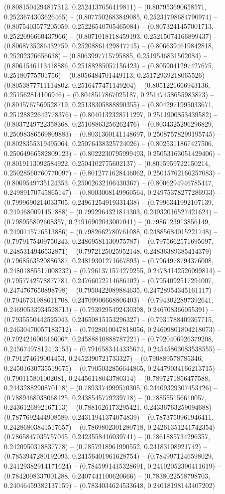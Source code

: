(0.8081504294817312, 0.2524137656419811) -- (0.807953690658571, 0.2523674303626465) -- (0.8077502683849085, 0.25231798684790974) -- (0.8075403577205059, 0.25226540705465084) -- (0.8073241457001713, 0.2522096660437966) -- (0.8071018118459193, 0.25215074166899437) -- (0.8068735286432759, 0.25208861429847745) -- (0.8066394619842818, 0.25202326656638) -- (0.8063997715795885, 0.2519546831502084) -- (0.8061546113418886, 0.25188285057156423) -- (0.8059041297427675, 0.25180775701756) -- (0.8056484701449113, 0.25172939218065526) -- (0.8053877711114802, 0.2516477471149204) -- (0.8051221666943136, 0.251562814106946) -- (0.8048517867025187, 0.25147458655983873) -- (0.8045767569528719, 0.25138305888890355) -- (0.8042971995033671, 0.25128822642778376) -- (0.8040132328711297, 0.2511900853439582) -- (0.8037249722358368, 0.25108863256262476) -- (0.8034325296296829, 0.25098386569809883) -- (0.8031360141148697, 0.25087578299195745) -- (0.8028355319495064, 0.25076438325724026) -- (0.8025311867427506, 0.25064966582809123) -- (0.8022230795999493, 0.25053163051429406) -- (0.8019113092584922, 0.2504102775602137) -- (0.8015959722150214, 0.25028560760770097) -- (0.8012771628446062, 0.25015762166257083) -- (0.8009549735124353, 0.25002632106430367) -- (0.8006294946785447, 0.24989170745865147) -- (0.8003008149960564, 0.24975378277286933) -- (0.7999690214033705, 0.24961254919331438) -- (0.7996341992107139, 0.2494680091451888) -- (0.7992964321814303, 0.24932016527421624) -- (0.798955802608357, 0.24916902043007041) -- (0.7986123913856149, 0.2490145776513886) -- (0.7982662780761088, 0.24885684015221748) -- (0.7979175409750243, 0.24869581130975787) -- (0.7975662571695697, 0.2485314946532871) -- (0.7972125025952148, 0.24836389385414379) -- (0.7968563520886387, 0.24819301271667893) -- (0.7964978794376008, 0.24801885517008232) -- (0.7961371574279255, 0.24784142526099814) -- (0.7957742578877781, 0.24766072714686102) -- (0.7954092517294007, 0.2474767650898798) -- (0.7950422089884635, 0.24728954345161117) -- (0.7946731988611708, 0.24709906668806403) -- (0.7943022897392641, 0.24690533934528713) -- (0.7939295492430398, 0.246708366055391) -- (0.7935550442525043, 0.24650815153296327) -- (0.7931788409367715, 0.24630470057183712) -- (0.7928010047818056, 0.24609801804218073) -- (0.7924216006166067, 0.24588810888787221) -- (0.7920406926379208, 0.24567497812413153) -- (0.7916583444335674, 0.24545863083538555) -- (0.791274619004453, 0.2452390721733327) -- (0.790889578785346, 0.24501630735519675) -- (0.7905032856644865, 0.24479034166213715) -- (0.790115801002081, 0.24456118043780314) -- (0.7897271856477588, 0.2443288290870118) -- (0.7893374999570305, 0.24409329307453426) -- (0.7889468038068125, 0.2438545779239718) -- (0.788555156610057, 0.2436126892167113) -- (0.7881626173295421, 0.24336763259094688) -- (0.7877692444908589, 0.24311941374074839) -- (0.7873750961946411, 0.24286803841517657) -- (0.7869802301280718, 0.24261351241742354) -- (0.7865847035757045, 0.2423558416039741) -- (0.7861885734296357, 0.2420950318837778) -- (0.7857918961990552, 0.24183108921742) -- (0.7853947280192093, 0.24156401961628754) -- (0.7849971246598029, 0.24129382914171624) -- (0.7845991415328691, 0.24102052390411619) -- (0.7842008337001288, 0.2407441100620666) -- (0.7838022558798703, 0.24046459382137159) -- (0.7834034624533648, 0.24018198143407202) 